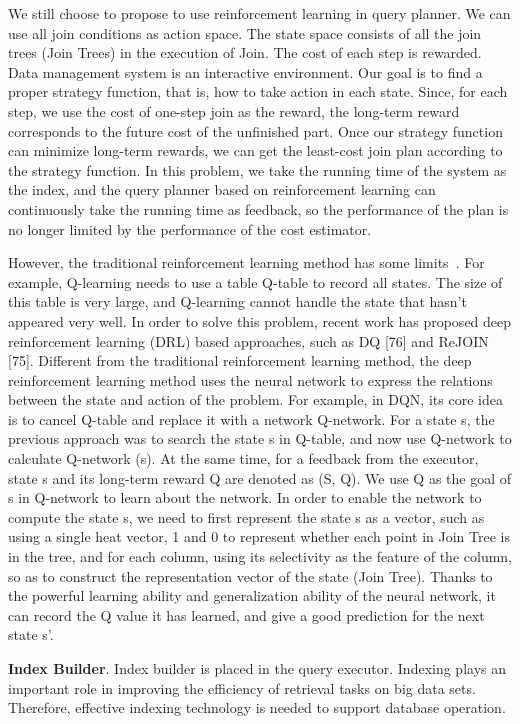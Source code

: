 We still choose to propose to use reinforcement learning in query planner.
We can use all join conditions as action space. The state space consists of all the join trees (Join Trees) in the execution of Join. The cost of each step is rewarded. Data management system is an interactive environment. Our goal is to find a proper strategy function, that is, how to take action in each state. Since, for each step, we use the cost of one-step join as the reward, the long-term reward corresponds to the future cost of the unfinished part. Once our strategy function can minimize long-term rewards, we can get the least-cost join plan according to the strategy function. In this problem, we take the running time of the system as the index, and the query planner based on reinforcement learning can continuously take the running time as feedback, so the performance of the plan is no longer limited by the performance of the cost estimator.

However, the traditional reinforcement learning method has some limits~\cite{DBLP:journals/access/MaglogiannisNSM18}. For example, Q-learning needs to use a table Q-table to record all states. The size of this table is very large, and Q-learning cannot handle the state that hasn't appeared very well. In order to solve this problem, recent work has proposed deep reinforcement learning (DRL) based approaches, such as DQ [76] and ReJOIN [75]. Different from the traditional reinforcement learning method, the deep reinforcement learning method uses the neural network to express the relations between the state and action of the problem. For example, in DQN, its core idea is to cancel Q-table and replace it with a network Q-network. For a state s, the previous approach was to search the state s in Q-table, and now use Q-network to calculate Q-network (s). At the same time, for a feedback from the executor, state s and its long-term reward Q are denoted as (S, Q). We use Q as the goal of s in Q-network to learn about the network. In order to enable the network to compute the state s, we need to first represent the state s as a vector, such as using a single heat vector, 1 and 0 to represent whether each point in Join Tree is in the tree, and for each column, using its selectivity as the feature of the column, so as to construct the representation vector of the state (Join Tree). Thanks to the powerful learning ability and generalization ability of the neural network, it can record the Q value it has learned, and give a good prediction for the next state s'.

\noindent \textbf{Index Builder}. Index builder is placed in the query executor. Indexing plays an important role in improving the efficiency of retrieval tasks on big data sets. Therefore, effective indexing technology is needed to support database operation. 

